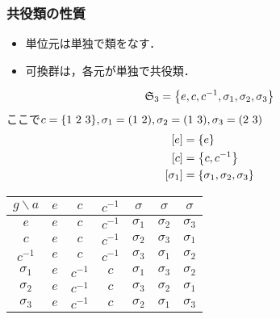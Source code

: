 \documentclass[main]{subfiles}
\begin{document}
		\subsubsection{共役類の性質}
			\begin{itemize}
				\item 単位元は単独で類をなす．
				\item 可換群は，各元が単独で共役類．
			\end{itemize}
			\begin{ex}
				\[\mathfrak{S}_3=\qty{e,c,c^{-1},\sigma_1,\sigma_2,\sigma_3}\]
				ここで$c=\qty{1\ 2\ 3},\sigma_1=\qty(1\ 2),\sigma_2=\qty(1\ 3),\sigma_3=\qty(2\ 3)$
				\begin{align*}
					\qty[e]        & =\qty{e}                          \\
					\qty[c]        & =\qty{c,c^{-1}}                   \\
					\qty[\sigma_1] & =\qty{\sigma_1,\sigma_2,\sigma_3}
				\end{align*}
				\begin{table}[h]
					\centering
					\begin{tabular}{c|cccccc}
						$g\backslash a$  & $e$  & $c$       & $c^{-1}$  & $\sigma$    & $\sigma$    & $\sigma$    \\\hline
						$e$              & $e$  & $c$       & $c^{-1}$  & $\sigma_1$  & $\sigma_2$  & $\sigma_3$  \\
						$c$              & $e$  & $c$       & $c^{-1}$  & $\sigma_2$  & $\sigma_3$  & $\sigma_1$  \\
						$c^{-1}$         & $e$  & $c$       & $c^{-1}$  & $\sigma_3$  & $\sigma_1$  & $\sigma_2$  \\
						$\sigma_1$       & $e$  & $c^{-1}$  & $c$       & $\sigma_1$  & $\sigma_3$  & $\sigma_2$  \\
						$\sigma_2$       & $e$  & $c^{-1}$  & $c$       & $\sigma_3$  & $\sigma_2$  & $\sigma_1$  \\
						$\sigma_3$       & $e$  & $c^{-1}$  & $c$       & $\sigma_2$  & $\sigma_1$  & $\sigma_3$
					\end{tabular}
				\end{table}
			\end{ex}
\end{document}
